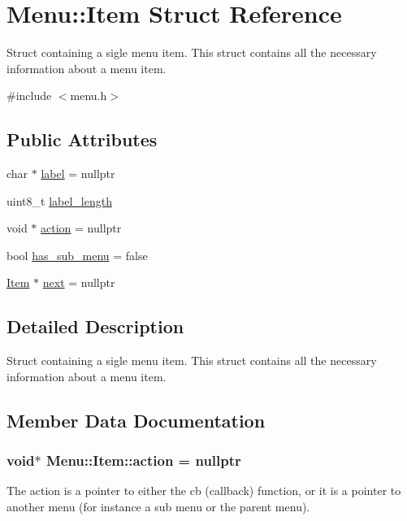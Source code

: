 \hypertarget{struct_menu_1_1_item}{}\section{Menu\+:\+:Item Struct Reference}
\label{struct_menu_1_1_item}


Struct containing a sigle menu item. This struct contains all the necessary information about a menu item.  




{\ttfamily \#include $<$menu.\+h$>$}

\subsection*{Public Attributes}
\begin{DoxyCompactItemize}
\item 
char $\ast$ \hyperlink{struct_menu_1_1_item_a378723382fc64c752a85ffe6fec9707e}{label} = nullptr
\item 
uint8\+\_\+t \hyperlink{struct_menu_1_1_item_a46749d046bbbde8d5308848d5394c2dc}{label\+\_\+length}
\item 
void $\ast$ \hyperlink{struct_menu_1_1_item_a247e140fed2addf80986ba5a3506b9dd}{action} = nullptr
\item 
bool \hyperlink{struct_menu_1_1_item_a5c9895a137458b9a12dafd447ac7430b}{has\+\_\+sub\+\_\+menu} = false
\item 
\hyperlink{struct_menu_1_1_item}{Item} $\ast$ \hyperlink{struct_menu_1_1_item_aadcc1e4e824296c6b72ac7d053f06869}{next} = nullptr
\end{DoxyCompactItemize}


\subsection{Detailed Description}
Struct containing a sigle menu item. This struct contains all the necessary information about a menu item. 

\subsection{Member Data Documentation}
\subsubsection[{\texorpdfstring{action}{action}}]{\setlength{\rightskip}{0pt plus 5cm}void$\ast$ Menu\+::\+Item\+::action = nullptr}\hypertarget{struct_menu_1_1_item_a247e140fed2addf80986ba5a3506b9dd}{}\label{struct_menu_1_1_item_a247e140fed2addf80986ba5a3506b9dd}
The action is a pointer to either the cb (callback) function, or it is a pointer to another menu (for instance a sub menu or the parent menu). 
